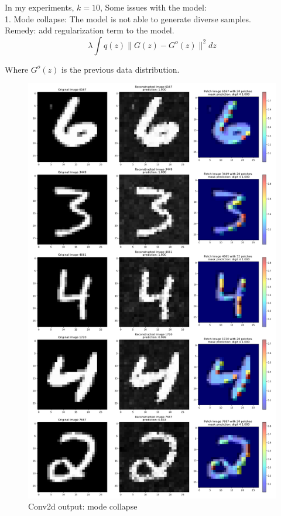 \documentclass[12pt]{article}
\begin{document}
In my experiments, $k=10$, Some issues with the model:\\ 

1. Mode collapse: The model is not able to generate diverse samples.\\ 
  Remedy: add regularization term to the model\cite{Su}.\\ 
$$\lambda\int q(z)\|G(z)-G^{o}(z)\|^{2}d z$$

Where $G^{o}(z)$ is the previous data distribution.\\

\begin{figure}[H]
    \centering
    \includegraphics[width=0.8\linewidth]{../fig/ID_7687_Original_Reconstructed_Patch.png} %
    \caption{Conv2d output: mode collapse}
    \label{fig:mode_collapse}
\end{figure}
\end{document}
